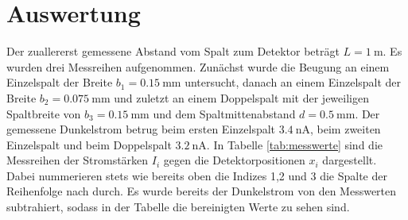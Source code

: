 \section{Auswertung}
\label{sec:Auswertung}

Der zuallererst gemessene Abstand vom Spalt zum Detektor beträgt $L = \SI{1}{\meter}$.
Es wurden drei Messreihen aufgenommen. Zunächst wurde die Beugung an einem Einzelspalt
der Breite $b_1 = \SI{0.15}{\milli\meter}$ untersucht, danach an einem Einzelspalt
der Breite $b_2 = \SI{0.075}{\milli\meter}$ und zuletzt an einem Doppelspalt mit
der jeweiligen Spaltbreite von $b_3 = \SI{0.15}{\milli\meter}$ und dem Spaltmittenabstand
$d = \SI{0.5}{\milli\meter}$. Der gemessene Dunkelstrom betrug beim ersten Einzelspalt
$\SI{3.4}{\nano\ampere}$, beim zweiten Einzelspalt und beim Doppelspalt
$\SI{3.2}{\nano\ampere}$. In Tabelle \ref{tab:messwerte} sind die Messreihen der Stromstärken
$I_i$ gegen die Detektorpositionen $x_i$ dargestellt. Dabei nummerieren stets wie bereits oben die Indizes 1,2 und 3 die
Spalte der Reihenfolge nach durch. Es wurde bereits der Dunkelstrom von den Messwerten
subtrahiert, sodass in der Tabelle die bereinigten Werte zu sehen sind.

